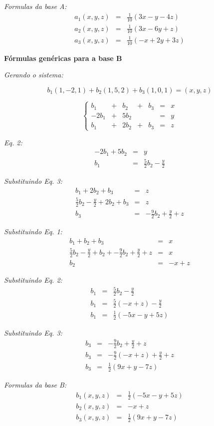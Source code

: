 \documentclass[11pt]{article}
\newenvironment{question}[1]
  {\par\addvspace{\medskipamount}
   \noindent\makebox[0pt][r]{\textbf{#1)} }\ignorespaces}
  {\par\addvspace{\medskipamount}}
\begin{document}
\begin{question}{1}
\bigskip
\textit{Formulas da base A:}
$$
\begin{array}{rcl}
    a_1(x,y,z) &= &\frac{1}{10}(3x-y-4z)\\
    a_2(x,y,z) &= &\frac{1}{10}(3x-6y+z)\\
    a_3(x,y,z) &= &\frac{1}{10}(-x+2y+3z)
\end{array}
$$

\newpage
\bigskip
\textbf{Fórmulas genéricas para a base B}

\bigskip
\textit{Gerando o sistema:} 

$$b_1(1,-2,1)+b_2(1,5,2)+b_3(1,0,1)=(x,y,z)$$

$$
\left\{\begin{array}{rcrcrcr}
    b_1   &+ &b_2  &+ &b_3 &= &x\\
    -2b_1 &+ &5b_2 &  &    &= &y\\
    b_1   &+ &2b_2 &+ &b_3 &= &z
\end{array}\right.
$$

\textit{Eq. 2:}
$$
\begin{array}{rcl}
    -2b_1 + 5b_2 &= &y\\
    b_1 &= &\frac{5}{2}b_2-\frac{y}{2}
\end{array}
$$

\bigskip
\textit{Substituindo Eq. 3:}
$$
\begin{array}{rcl}
    b_1+2b_2+b_3 &= &z\\
    \frac{5}{2}b_2-\frac{y}{2}+2b_2+b_3 &= &z\\
    b_3 &= &-\frac{9}{2}b_2+\frac{y}{2}+z
\end{array}
$$

\bigskip
\textit{Substituindo Eq. 1:}
$$
\begin{array}{rcl}
    b_1+b_2+b_3 &= &x\\
    \frac{5}{2}b_2-\frac{y}{2}+b_2+-\frac{9}{2}b_2+\frac{y}{2}+z &= &x\\
    b_2 &= &-x+z
\end{array}
$$

\bigskip
\textit{Substituindo Eq. 2:}
$$
\begin{array}{rcl}
    b_1 &= &\frac{5}{2}b_2-\frac{y}{2}\\
    b_1 &= &\frac{5}{2}(-x+z)-\frac{y}{2}\\
    b_1 &= &\frac{1}{2}(-5x-y+5z)
\end{array}
$$

\bigskip
\textit{Substituindo Eq. 3:}
$$
\begin{array}{rcl}
    b_3 &= &-\frac{9}{2}b_2+\frac{y}{2}+z\\
    b_3 &= &-\frac{9}{2}(-x+z)+\frac{y}{2}+z\\
    b_3 &= &\frac{1}{2}(9x+y-7z)
\end{array}
$$

\bigskip
\textit{Formulas da base B:}
$$
\begin{array}{rcl}
    b_1(x,y,z) &= &\frac{1}{2}(-5x-y+5z)\\
    b_2(x,y,z) &= &-x+z\\
    b_3(x,y,z) &= &\frac{1}{2}(9x+y-7z)
\end{array}
$$




\end{question}
\end{document}
